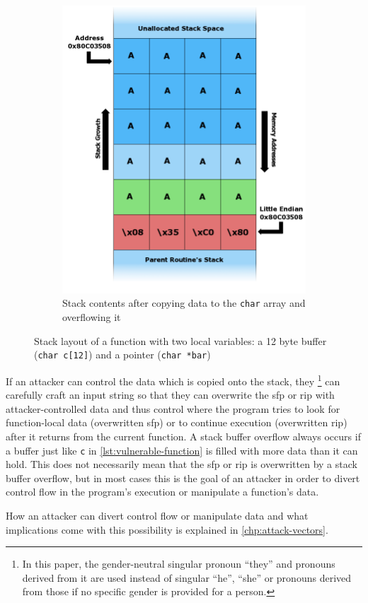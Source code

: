 \begin{figure}[htb]
\begin{subfigure}[t]{0.3\textwidth}
		\includegraphics[height=0.25\textheight]{figures/Stack_Overflow_4}
		\caption{Stack contents after copying data to the \texttt{char} array and overflowing it \cite{Lynn2007b}}
		\label{fig:stack-layout-overflow}
	\end{subfigure}
	\caption{Stack layout of a function with two local variables: a 12 byte buffer (\texttt{char c[12]}) and a pointer (\texttt{char *bar})}
	\label{fig:stack-layout}
\end{figure}

If an attacker can control the data which is copied onto the stack, they%
	\footnote{In this paper, the gender-neutral singular pronoun ``they'' and pronouns derived from it are used instead of singular ``he'', ``she'' or pronouns derived from those if no specific gender is provided for a person.}
can carefully craft an input string so that they can overwrite the \gls{sfp} or \gls{rip} with attacker-controlled data and thus control where the program tries to look for function-local data (overwritten \gls{sfp}) or to continue execution (overwritten \gls{rip}) after it returns from the current function.
A stack buffer overflow always occurs if a buffer just like \texttt{c} in \cref{lst:vulnerable-function} is filled with more data than it can hold.
This does not necessarily mean that the \gls{sfp} or \gls{rip} is overwritten by a stack buffer overflow, but in most cases this is the goal of an attacker in order to divert control flow in the program's execution or manipulate a function's data.

How an attacker can divert control flow or manipulate data and what implications come with this possibility is explained in \cref{chp:attack-vectors}.

